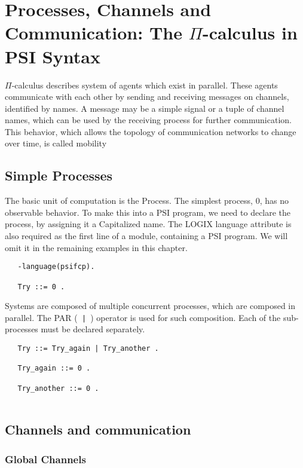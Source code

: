 \chapter{Processes, Channels and Communication: The $\Pi$-calculus in
PSI Syntax}
\label{syntax}

$\Pi$-calculus describes system of agents which exist in
parallel. These agents communicate with each other by sending and
receiving messages on channels, identified by names. A message may
be a simple signal or a tuple of channel names, which can be used by the
receiving process for further communication. This behavior, which
allows the topology of communication networks to change over time, is
called mobility

\section{Simple Processes}

The basic unit of computation is the Process. The simplest process, 0,
has no observable behavior. To make this into a PSI program, we need
to declare the process, by assigning it a Capitalized name. The LOGIX
language attribute is also required as the first line of a module,
containing a PSI program. We
will omit it in the remaining examples in this chapter.

\begin{verbatim}
   -language(psifcp).

   Try ::= 0 .

\end{verbatim}

Systems are composed of multiple concurrent processes, which are
composed in parallel. The PAR (\verb+ | +) operator is used for such
composition. Each of the sub-processes must be declared separately.

\begin{verbatim}
   Try ::= Try_again | Try_another .

   Try_again ::= 0 .

   Try_another ::= 0 .
 
\end{verbatim}

\section{Channels and communication}

\subsection{Global Channels}

